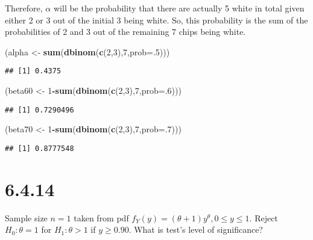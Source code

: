 \documentclass[]{article}
\newenvironment{Shaded}{\begin{snugshade}}{\end{snugshade}}
\newcommand{\KeywordTok}[1]{\textcolor[rgb]{0.13,0.29,0.53}{\textbf{#1}}}
\newcommand{\DataTypeTok}[1]{\textcolor[rgb]{0.13,0.29,0.53}{#1}}
\newcommand{\DecValTok}[1]{\textcolor[rgb]{0.00,0.00,0.81}{#1}}
\newcommand{\StringTok}[1]{\textcolor[rgb]{0.31,0.60,0.02}{#1}}
\newcommand{\OperatorTok}[1]{\textcolor[rgb]{0.81,0.36,0.00}{\textbf{#1}}}
\newcommand{\NormalTok}[1]{#1}
\begin{document}
Therefore, \(\alpha\) will be the probability that there are actually 5
white in total given either 2 or 3 out of the initial 3 being white. So,
this probability is the sum of the probabilities of 2 and 3 out of the
remaining 7 chips being white.

\begin{Shaded}
\begin{Highlighting}[]
\NormalTok{(alpha <-}\StringTok{ }\KeywordTok{sum}\NormalTok{(}\KeywordTok{dbinom}\NormalTok{(}\KeywordTok{c}\NormalTok{(}\DecValTok{2}\NormalTok{,}\DecValTok{3}\NormalTok{),}\DecValTok{7}\NormalTok{,}\DataTypeTok{prob=}\NormalTok{.}\DecValTok{5}\NormalTok{)))}
\end{Highlighting}
\end{Shaded}

\begin{verbatim}
## [1] 0.4375
\end{verbatim}

\begin{Shaded}
\begin{Highlighting}[]
\NormalTok{(beta60 <-}\StringTok{ }\DecValTok{1}\OperatorTok{-}\KeywordTok{sum}\NormalTok{(}\KeywordTok{dbinom}\NormalTok{(}\KeywordTok{c}\NormalTok{(}\DecValTok{2}\NormalTok{,}\DecValTok{3}\NormalTok{),}\DecValTok{7}\NormalTok{,}\DataTypeTok{prob=}\NormalTok{.}\DecValTok{6}\NormalTok{)))}
\end{Highlighting}
\end{Shaded}

\begin{verbatim}
## [1] 0.7290496
\end{verbatim}

\begin{Shaded}
\begin{Highlighting}[]
\NormalTok{(beta70 <-}\StringTok{ }\DecValTok{1}\OperatorTok{-}\KeywordTok{sum}\NormalTok{(}\KeywordTok{dbinom}\NormalTok{(}\KeywordTok{c}\NormalTok{(}\DecValTok{2}\NormalTok{,}\DecValTok{3}\NormalTok{),}\DecValTok{7}\NormalTok{,}\DataTypeTok{prob=}\NormalTok{.}\DecValTok{7}\NormalTok{)))}
\end{Highlighting}
\end{Shaded}

\begin{verbatim}
## [1] 0.8777548
\end{verbatim}

\section{6.4.14}\label{section-10}

Sample size \(n=1\) taken from pdf
\(f_Y(y)=(\theta+1)y^\theta, 0 \leq y \leq 1\). Reject \(H_0: \theta=1\)
for \(H_1:\theta > 1\) if \(y \geq 0.90\). What is test's level of
significance?
\end{document}
